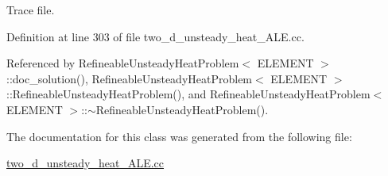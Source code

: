 Trace file. 



Definition at line 303 of file two\+\_\+d\+\_\+unsteady\+\_\+heat\+\_\+\+A\+L\+E.\+cc.



Referenced by Refineable\+Unsteady\+Heat\+Problem$<$ E\+L\+E\+M\+E\+N\+T $>$\+::doc\+\_\+solution(), Refineable\+Unsteady\+Heat\+Problem$<$ E\+L\+E\+M\+E\+N\+T $>$\+::\+Refineable\+Unsteady\+Heat\+Problem(), and Refineable\+Unsteady\+Heat\+Problem$<$ E\+L\+E\+M\+E\+N\+T $>$\+::$\sim$\+Refineable\+Unsteady\+Heat\+Problem().



The documentation for this class was generated from the following file\+:\begin{DoxyCompactItemize}
\item 
\hyperlink{two__d__unsteady__heat__ALE_8cc}{two\+\_\+d\+\_\+unsteady\+\_\+heat\+\_\+\+A\+L\+E.\+cc}\end{DoxyCompactItemize}
